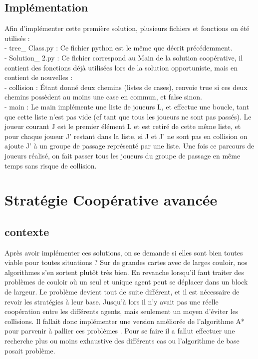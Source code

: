 \documentclass{article}
\begin{document}
\subsection{Implémentation}

Afin d'implémenter cette première solution, plusieurs fichiers et fonctions on été utilisés : \\ 

- tree\_ Class.py : Ce fichier python est le même que décrit précédemment.\\ 

- Solution\_ 2.py : Ce fichier correspond au Main de la solution coopérative, il contient des fonctions déjà utilisées lors de la solution opportuniste, mais en contient de nouvelles : \\ 

- collision : Étant donné deux chemins (listes de cases), renvoie true si ces deux chemins possèdent au moins une case en commun, et false sinon. \\ 
	
- main : Le main implémente une liste de joueurs L, et effectue une boucle, tant que cette liste n'est pas vide (cf tant que tous les joueurs ne sont pas passés). Le joueur courant J est le premier élément L et est retiré de cette même liste, et pour chaque joueur J' restant dans la liste, si J et J' ne sont pas en collision on ajoute J' à un groupe de passage représenté par une liste. Une fois ce parcours de joueurs réalisé, on fait passer tous les joueurs du groupe de passage en même temps sans risque de collision.\\

\section{Stratégie Coopérative avancée}

\subsection{contexte}

Après avoir implémenter ces solutions, on se demande si elles sont bien toutes viable pour toutes situations ? Sur de grandes cartes avec de larges couloir, nos algorithmes s’en sortent plutôt très bien. En revanche lorsqu’il faut traiter des problèmes de couloir où un seul et unique agent peut se déplacer dans un block de largeur. Le problème devient tout de suite différent, et  il est nécessaire de revoir les stratégies à leur base. Jusqu'à lors il n’y avait pas une réelle coopération entre les différents agents, mais seulement un moyen d’éviter les collisions. Il fallait donc implémenter une version améliorée de l’algorithme A* pour parvenir à pallier ces problèmes . Pour se faire il a fallut effectuer une recherche plus ou moins exhaustive des différents cas ou l’algorithme de base posait problème.
\end{document}
